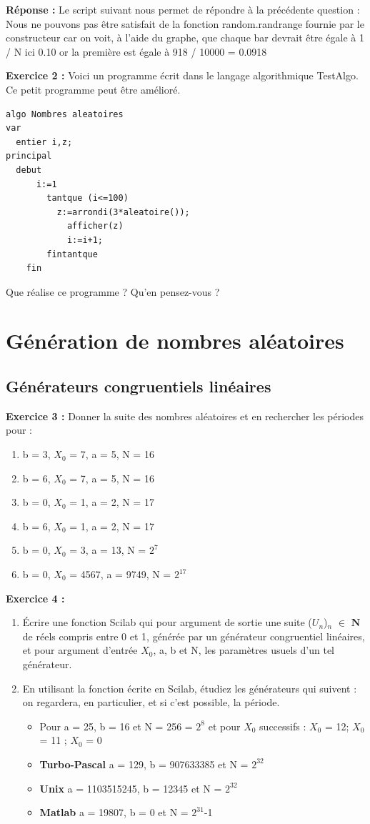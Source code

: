 \documentclass{book}
\begin{document}
\textbf{Réponse :} Le script suivant nous permet de répondre à la précédente question : Nous ne pouvons pas être satisfait de la fonction random.randrange fournie par le constructeur car on voit, à l'aide du graphe, que chaque bar devrait être égale à 1 / N ici 0.10 or la première est égale à 918 / 10000 = 0.0918
\newline

\textbf{Exercice 2 :}
Voici un programme écrit dans le langage algorithmique TestAlgo.
Ce petit programme peut être amélioré.
\begin{lstlisting}[frame=single]
algo Nombres aleatoires
var
  entier i,z;
principal
  debut
	  i:=1
		tantque (i<=100)
		  z:=arrondi(3*aleatoire());
			afficher(z)
			i:=i+1;
		fintantque
	fin
\end{lstlisting}
Que réalise ce programme ? Qu'en pensez-vous ?
\section{Génération de nombres aléatoires}
\subsection{Générateurs congruentiels linéaires}
\textbf{Exercice 3 :}
Donner la suite des nombres aléatoires et en rechercher les périodes pour : 
\begin{enumerate}
	\item b = 3, $X_0$ = 7, a = 5, N = 16 
	\item b = 6, $X_0$ = 7, a = 5, N = 16 
	\item b = 0, $X_0$ = 1, a = 2, N = 17 
	\item b = 6, $X_0$ = 1, a = 2, N = 17 
	\item b = 0, $X_0$ = 3, a = 13, N = $2^7$ 
	\item b = 0, $X_0$ = 4567, a = 9749, N = $2^{17}$ 
\end{enumerate}
\textbf{Exercice 4 :}
\begin{enumerate}
	\item Écrire une fonction Scilab qui pour argument de sortie une suite ($U_{n}$)$_{n}$ $\in$ $\mathbf{N}$ de réels compris entre 0 et 1, générée par un générateur congruentiel linéaires, et pour argument d'entrée $X_0$, a, b et N, les paramètres usuels d'un tel générateur.
	\item En utilisant la fonction écrite en Scilab, étudiez les générateurs qui suivent : on regardera, en particulier, et si c'est possible, la période.
	\begin{itemize}
		\item Pour a = 25, b = 16 et N = 256 = $2^8$ et pour $X_0$ successifs : $X_0$ = 12; $X_0$ = 11 ; $X_0$ = 0
		\item \textbf{Turbo-Pascal} a = 129, b = 907633385 et N = $2^{32}$
		\item \textbf{Unix} a = 1103515245, b = 12345 et N = $2^{32}$
		\item \textbf{Matlab} a = 19807, b = 0 et N = $2^{31}$-1
	\end{itemize}
\end{enumerate}
\end{document}
